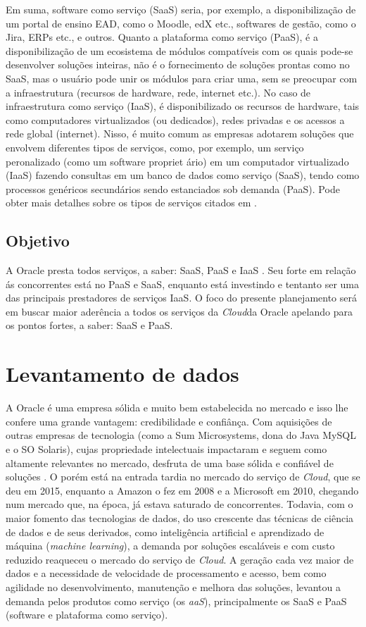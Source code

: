 \documentclass[a4paper]{article}
\newcommand{\C}{\emph{Cloud}}
\begin{document}
Em suma, software como serviço (SaaS) seria, por exemplo, a disponibilização de um portal de ensino EAD, como o Moodle, edX etc., softwares de gestão, como o Jira, ERPs etc., e outros. Quanto a plataforma como serviço (PaaS), é a disponibilização de um ecosistema de módulos compatíveis com os quais pode-se desenvolver soluções inteiras, não é o fornecimento de soluções prontas como no SaaS, mas o usuário pode unir os módulos para criar uma, sem se preocupar com a infraestrutura (recursos de hardware, rede, internet etc.). No caso de infraestrutura como serviço (IaaS), é disponibilizado os recursos de hardware, tais como computadores virtualizados (ou dedicados), redes privadas e os acessos a rede global (internet). Nisso, é muito comum as empresas adotarem soluções que envolvem diferentes tipos de serviços, como, por exemplo, um serviço peronalizado (como um software propriet
ário) em um computador virtualizado (IaaS) fazendo consultas em um banco de dados como serviço (SaaS), tendo como processos genéricos secundários sendo estanciados sob demanda (PaaS). Pode obter mais detalhes sobre os tipos de serviços citados em . 

\subsection{Objetivo}
A Oracle presta todos serviços, a saber: SaaS, PaaS e IaaS \cite{OqueeOra85:online}. Seu forte em relação ás concorrentes está no PaaS e SaaS, enquanto está investindo e tentanto ser uma das principais prestadores de serviços IaaS. O foco do presente planejamento será em buscar maior aderência a todos os serviços da \C da Oracle apelando para os pontos fortes, a saber: SaaS e PaaS.

\section{Levantamento de dados}

A Oracle é uma empresa sólida e muito bem estabelecida no mercado e isso lhe confere uma grande vantagem: credibilidade e confiânça. Com aquisições de outras empresas de tecnologia (como a Sum Microsystems, dona do Java MySQL e o SO Solaris), cujas propriedade intelectuais impactaram e seguem como altamente relevantes no mercado, desfruta de uma base sólida e confiável de soluções \cite{AlookatO22:online}. O porém está na entrada tardia no mercado do serviço de \C, que se deu em 2015, enquanto a Amazon o fez em 2008 e a Microsoft em 2010, chegando num mercado que, na 
época, já estava saturado de concorrentes. Todavia, com o maior fomento das tecnologias de dados, do uso crescente das técnicas de ciência de dados e de seus derivados, como inteligência artificial e aprendizado de máquina (\emph{machine learning}), a demanda por soluções escaláveis e com custo reduzido reaqueceu o mercado do serviço de \C. A geração cada vez maior de dados e a necessidade de velocidade de processamento e acesso, bem como agilidade no desenvolvimento, manutenção e melhora das soluções, levantou a demanda pelos produtos como serviço (os \emph{aaS}), principalmente os SaaS e PaaS (software e plataforma como serviço).
\end{document}
